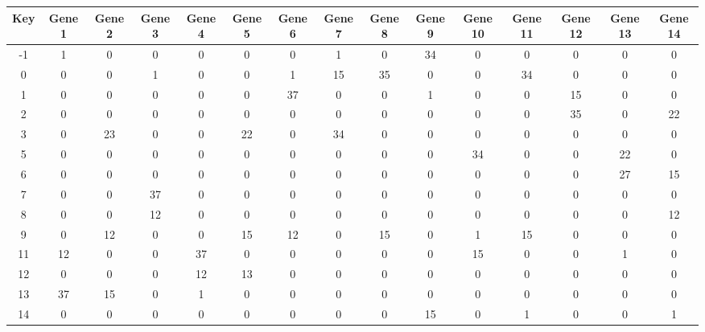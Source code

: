 \begin{tabular}{|c|c|c|c|c|c|c|c|c|c|c|c|c|c|c|}
\hline
Key & Gene 1 & Gene 2 & Gene 3 & Gene 4 & Gene 5 & Gene 6 & Gene 7 & Gene 8 & Gene 9 & Gene 10 & Gene 11 & Gene 12 & Gene 13 & Gene 14 \\
\hline
-1 & 1 & 0 & 0 & 0 & 0 & 0 & 1 & 0 & 34 & 0 & 0 & 0 & 0 & 0 \\
0 & 0 & 0 & 1 & 0 & 0 & 1 & 15 & 35 & 0 & 0 & 34 & 0 & 0 & 0 \\
1 & 0 & 0 & 0 & 0 & 0 & 37 & 0 & 0 & 1 & 0 & 0 & 15 & 0 & 0 \\
2 & 0 & 0 & 0 & 0 & 0 & 0 & 0 & 0 & 0 & 0 & 0 & 35 & 0 & 22 \\
3 & 0 & 23 & 0 & 0 & 22 & 0 & 34 & 0 & 0 & 0 & 0 & 0 & 0 & 0 \\
5 & 0 & 0 & 0 & 0 & 0 & 0 & 0 & 0 & 0 & 34 & 0 & 0 & 22 & 0 \\
6 & 0 & 0 & 0 & 0 & 0 & 0 & 0 & 0 & 0 & 0 & 0 & 0 & 27 & 15 \\
7 & 0 & 0 & 37 & 0 & 0 & 0 & 0 & 0 & 0 & 0 & 0 & 0 & 0 & 0 \\
8 & 0 & 0 & 12 & 0 & 0 & 0 & 0 & 0 & 0 & 0 & 0 & 0 & 0 & 12 \\
9 & 0 & 12 & 0 & 0 & 15 & 12 & 0 & 15 & 0 & 1 & 15 & 0 & 0 & 0 \\
11 & 12 & 0 & 0 & 37 & 0 & 0 & 0 & 0 & 0 & 15 & 0 & 0 & 1 & 0 \\
12 & 0 & 0 & 0 & 12 & 13 & 0 & 0 & 0 & 0 & 0 & 0 & 0 & 0 & 0 \\
13 & 37 & 15 & 0 & 1 & 0 & 0 & 0 & 0 & 0 & 0 & 0 & 0 & 0 & 0 \\
14 & 0 & 0 & 0 & 0 & 0 & 0 & 0 & 0 & 15 & 0 & 1 & 0 & 0 & 1 \\
\hline
\end{tabular}
